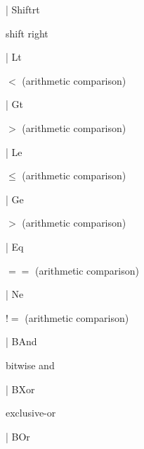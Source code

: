 \documentclass[11pt]{article}
\begin{document}
\begin{ocamldoccode}
  | Shiftrt
\end{ocamldoccode}
\begin{ocamldoccomment}
shift right
\end{ocamldoccomment}
\begin{ocamldoccode}
  | Lt
\end{ocamldoccode}
\begin{ocamldoccomment}
$<$  (arithmetic comparison)
\end{ocamldoccomment}
\begin{ocamldoccode}
  | Gt
\end{ocamldoccode}
\begin{ocamldoccomment}
$>$  (arithmetic comparison)
\end{ocamldoccomment}
\begin{ocamldoccode}
  | Le
\end{ocamldoccode}
\begin{ocamldoccomment}
$\leq$ (arithmetic comparison)
\end{ocamldoccomment}
\begin{ocamldoccode}
  | Ge
\end{ocamldoccode}
\begin{ocamldoccomment}
$>$  (arithmetic comparison)
\end{ocamldoccomment}
\begin{ocamldoccode}
  | Eq
\end{ocamldoccode}
\begin{ocamldoccomment}
$=$$=$ (arithmetic comparison)
\end{ocamldoccomment}
\begin{ocamldoccode}
  | Ne
\end{ocamldoccode}
\begin{ocamldoccomment}
!$=$ (arithmetic comparison)
\end{ocamldoccomment}
\begin{ocamldoccode}
  | BAnd
\end{ocamldoccode}
\begin{ocamldoccomment}
bitwise and
\end{ocamldoccomment}
\begin{ocamldoccode}
  | BXor
\end{ocamldoccode}
\begin{ocamldoccomment}
exclusive-or
\end{ocamldoccomment}
\begin{ocamldoccode}
  | BOr
\end{ocamldoccode}
\end{document}
